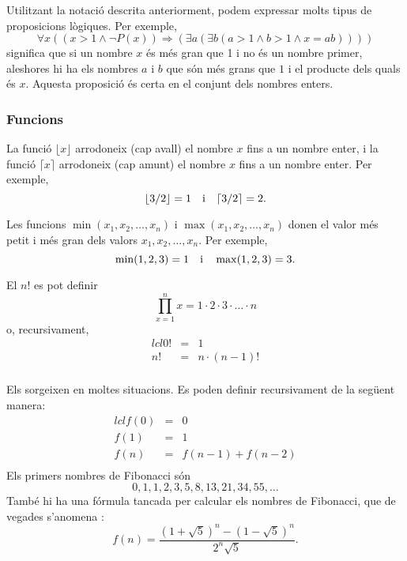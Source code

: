 Utilitzant la notació descrita anteriorment,
podem expressar molts tipus de proposicions lògiques.
Per exemple,
\[\forall x ((x>1 \land \lnot P(x)) \Rightarrow (\exists a (\exists b (a > 1 \land b > 1 \land x = ab))))\]
significa que si un nombre $x$ és més gran que 1
i no és un nombre primer,
aleshores hi ha els nombres $a$ i $b$
que són més grans que $1$ i el producte dels quals és $x$.
Aquesta proposició és certa en el conjunt dels nombres enters.

\subsubsection{Funcions}

La funció $\lfloor x \rfloor$ arrodoneix (cap avall) el nombre $x$
fins a un nombre enter, i la funció
$\lceil x \rceil$ arrodoneix (cap amunt) el nombre $x$
fins a un nombre enter. Per exemple,
\[ \lfloor 3/2 \rfloor = 1 \hspace{10px} \textrm{i} \hspace{10px} \lceil 3/2 \rceil = 2.\]

Les funcions $\min(x_1,x_2,\ldots,x_n)$
i $\max(x_1,x_2,\ldots,x_n)$
donen el valor més petit i més gran dels valors
$x_1,x_2,\ldots,x_n$.
Per exemple,
\[ \min(1,2,3)=1 \hspace{10px} \textrm{i} \hspace{10px} \max(1,2,3)=3.\]


El  $n!$ es pot definir
\[\prod_{x=1}^n x = 1 \cdot 2 \cdot 3 \cdot \ldots \cdot n\]
o, recursivament,
\[
\begin{matrix}{lcl}
0! & = & 1 \\
n! & = & n \cdot (n-1)! \\
\end{matrix}
\]


Els 
sorgeixen en moltes situacions.
Es poden definir recursivament de la següent manera:
\[
\begin{matrix}{lcl}
f(0) & = & 0 \\
f(1) & = & 1 \\
f(n) & = & f(n-1)+f(n-2) \\
\end{matrix}
\]
Els primers nombres de Fibonacci són
\[0, 1, 1, 2, 3, 5, 8, 13, 21, 34, 55, \ldots\]
També hi ha una fórmula tancada
per calcular els nombres de Fibonacci, que de vegades s'anomena
 :
\[f(n)=\frac{(1 + \sqrt{5})^n - (1-\sqrt{5})^n}{2^n \sqrt{5}}.\]

